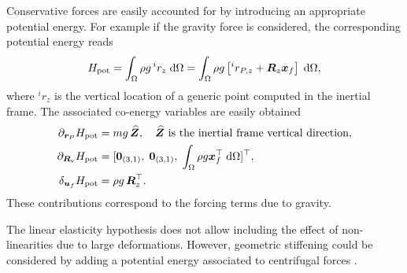 \begin{remark}
	Conservative forces are easily accounted for by introducing an appropriate potential energy. For example if the gravity force is considered, the corresponding potential energy reads
	\begin{equation*}
	H_{\mathrm{pot}} = \int_{\Omega} \rho g \, ^i r_z \d{\Omega} = \int_{\Omega} \rho g \left[ ^i r_{P, z} +\bm{R}_z \bm{x}_f \right] \d{\Omega},
	\end{equation*}
	where $^i r_z$ is the vertical location of a generic point computed in the inertial frame. The associated co-energy variables are easily obtained
	\begin{align*}
	\partial_{\bm{r}_P}H_{\mathrm{pot}} &= m g \, \widehat{\bm{Z}}, \quad \text{$\widehat{\bm{Z}}$ is the inertial frame vertical direction},\\
	\partial_{\bm{R}_\mathrm{v}}H_{\mathrm{pot}} &= [\bm{0}_{(3, 1)}, \; \bm{0}_{(3, 1)}, \; \int_{\Omega} \rho g \bm{x}_f^\top \d{\Omega}]^\top, \\
	\delta_{\bm{u}_f} H_{\mathrm{pot}} &= \rho g \, \bm{R}_z^\top.
	\end{align*}
	These contributions correspond to the forcing terms due to gravity.
\end{remark}

\begin{remark}
	The linear elasticity hypothesis does not allow including the effect of non-linearities due to large deformations.  However, geometric stiffening could be considered by adding a potential energy associated to centrifugal forces \cite{yigit1988flexural}. 
\end{remark}

